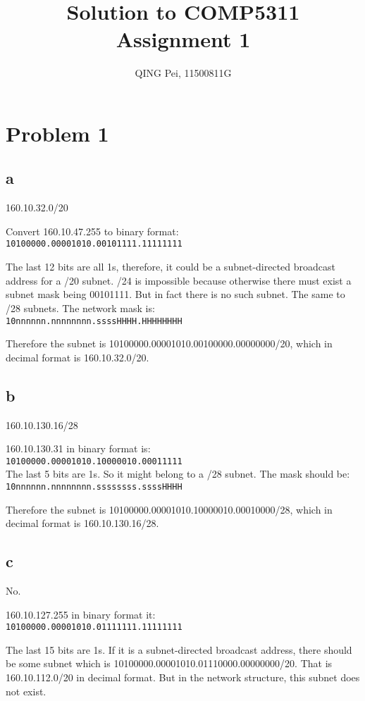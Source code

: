 \documentclass[11pt]{article}
\title{Solution to COMP5311 Assignment 1}
\author{QING Pei, 11500811G}
\begin{document}
\maketitle

\section{Problem 1}
\subsection{a}
160.10.32.0/20

Convert 160.10.47.255 to binary format: \\
\texttt{10100000.00001010.00101111.11111111}

The last 12 bits are all 1s, therefore, it could be a subnet-directed broadcast address for a /20 subnet. /24 is impossible because otherwise there must exist a subnet mask being 00101111. But in fact there is no such subnet. The same to /28 subnets. The network mask is:\\
\texttt{10nnnnnn.nnnnnnnn.ssssHHHH.HHHHHHHH}

Therefore the subnet is 10100000.00001010.00100000.00000000/20, which in decimal format is 160.10.32.0/20.

\subsection{b}
160.10.130.16/28

160.10.130.31 in binary format is:\\
\texttt{10100000.00001010.10000010.00011111}\\

The last 5 bits are 1s. So it might belong to a /28 subnet. The mask should be:\\
\texttt{10nnnnnn.nnnnnnnn.ssssssss.ssssHHHH}

Therefore the subnet is 10100000.00001010.10000010.00010000/28, which in decimal format is 160.10.130.16/28.

\subsection{c}
No.

160.10.127.255 in binary format it:\\
\texttt{10100000.00001010.01111111.11111111}

The last 15 bits are 1s. If it is a subnet-directed broadcast address, there should be some subnet which is 10100000.00001010.01110000.00000000/20. That is 160.10.112.0/20 in decimal format. But in the network structure, this subnet does not exist.
\end{document}
